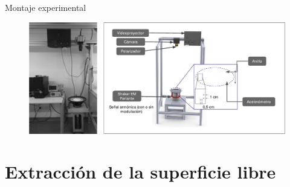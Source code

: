 \documentclass[aspectratio=169]{beamer}
\begin{document}
\begin{frame}{Montaje experimental}
	\begin{figure}[ht]
		\centering
		\includegraphics[width=1\textwidth]{figs/esquema_experimental.pdf}
	\end{figure}
\end{frame}

\section{Extracción de la superficie libre}
\end{document}
